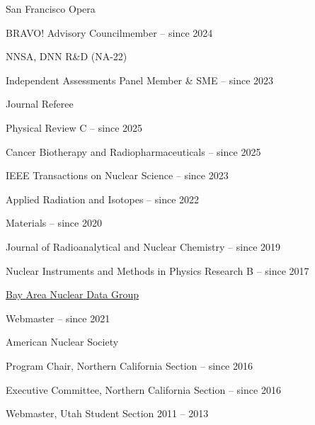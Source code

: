 \begin{list1}
\item[] San Francisco Opera
\begin{list2}
\item BRAVO! Advisory Councilmember \hfill{ -- since 2024}
\end{list2}
\item[] NNSA, DNN R\&D (NA-22)
\begin{list2}
\item Independent Assessments Panel Member \& SME \hfill{ -- since 2023}
\end{list2}
\item[] Journal Referee
\begin{list2}
\item Physical Review C \hfill{ -- since 2025}
\item Cancer Biotherapy and Radiopharmaceuticals \hfill{ -- since 2025}
\item IEEE Transactions on Nuclear Science \hfill{ -- since 2023}
\item Applied Radiation and Isotopes \hfill{ -- since 2022}
\item Materials \hfill{ -- since 2020}
\item Journal of Radioanalytical and Nuclear Chemistry \hfill{ -- since 2019}
\item Nuclear Instruments and Methods in Physics Research B   \hfill{ -- since 2017}
\end{list2}
\item[] \href{https://nucleardata.berkeley.edu/}{Bay Area Nuclear Data Group}
\begin{list2}
\item Webmaster   \hfill{ -- since 2021}
\end{list2}
\item[] American Nuclear Society  
\begin{list2}
\item Program Chair, Northern California Section \hfill{ -- since 2016}
\item Executive Committee, Northern California Section \hfill{ -- since 2016}
\item Webmaster, Utah Student Section \hfill{2011 --  2013}
\end{list2}
\end{list1}

